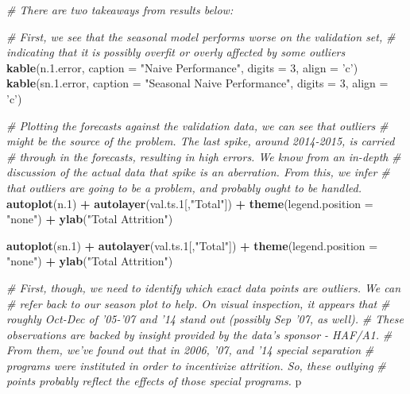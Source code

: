 \documentclass[12pt,letterpaper,toc=flat,oneside]{report}
\newenvironment{Shaded}{\begin{snugshade}}{\end{snugshade}}
\newcommand{\CommentTok}[1]{\textcolor[rgb]{0.56,0.35,0.01}{\textit{#1}}}
\newcommand{\DataTypeTok}[1]{\textcolor[rgb]{0.13,0.29,0.53}{#1}}
\newcommand{\DecValTok}[1]{\textcolor[rgb]{0.00,0.00,0.81}{#1}}
\newcommand{\FloatTok}[1]{\textcolor[rgb]{0.00,0.00,0.81}{#1}}
\newcommand{\KeywordTok}[1]{\textcolor[rgb]{0.13,0.29,0.53}{\textbf{#1}}}
\newcommand{\NormalTok}[1]{#1}
\newcommand{\OperatorTok}[1]{\textcolor[rgb]{0.81,0.36,0.00}{\textbf{#1}}}
\newcommand{\StringTok}[1]{\textcolor[rgb]{0.31,0.60,0.02}{#1}}
\theoremstyle{definition}
\theoremstyle{definition}
\theoremstyle{definition}
\theoremstyle{remark}
\begin{document}
\begin{Shaded}
\begin{Highlighting}[]
{{{{{{{{{{{{{{{{\CommentTok{# There are two takeaways from results below:}

\CommentTok{# First, we see that the seasonal model performs worse on the validation set, }
\CommentTok{# indicating that it is possibly overfit or overly affected by some outliers}
\KeywordTok{kable}\NormalTok{(n.}\FloatTok{1.}\NormalTok{error, }\DataTypeTok{caption =} \StringTok{"Naive Performance"}\NormalTok{, }\DataTypeTok{digits =} \DecValTok{3}\NormalTok{, }\DataTypeTok{align =} \StringTok{'c'}\NormalTok{)}
\KeywordTok{kable}\NormalTok{(sn.}\FloatTok{1.}\NormalTok{error, }\DataTypeTok{caption =} \StringTok{"Seasonal Naive Performance"}\NormalTok{, }\DataTypeTok{digits =} \DecValTok{3}\NormalTok{, }\DataTypeTok{align =} \StringTok{'c'}\NormalTok{)}


\CommentTok{# Plotting the forecasts against the validation data, we can see that outliers}
\CommentTok{# might be the source of the problem. The last spike, around 2014-2015, is carried}
\CommentTok{# through in the forecasts, resulting in high errors. We know from an in-depth }
\CommentTok{# discussion of the actual data that spike is an aberration. From this, we infer}
\CommentTok{# that outliers are going to be a problem, and probably ought to be handled.}
\KeywordTok{autoplot}\NormalTok{(n}\FloatTok{.1}\NormalTok{) }\OperatorTok{+}
\StringTok{  }\KeywordTok{autolayer}\NormalTok{(val.ts}\FloatTok{.1}\NormalTok{[,}\StringTok{"Total"}\NormalTok{]) }\OperatorTok{+}
\StringTok{  }\KeywordTok{theme}\NormalTok{(}\DataTypeTok{legend.position =} \StringTok{"none"}\NormalTok{) }\OperatorTok{+}
\StringTok{  }\KeywordTok{ylab}\NormalTok{(}\StringTok{"Total Attrition"}\NormalTok{)}

\KeywordTok{autoplot}\NormalTok{(sn}\FloatTok{.1}\NormalTok{) }\OperatorTok{+}
\StringTok{  }\KeywordTok{autolayer}\NormalTok{(val.ts}\FloatTok{.1}\NormalTok{[,}\StringTok{"Total"}\NormalTok{]) }\OperatorTok{+}
\StringTok{  }\KeywordTok{theme}\NormalTok{(}\DataTypeTok{legend.position =} \StringTok{"none"}\NormalTok{) }\OperatorTok{+}
\StringTok{  }\KeywordTok{ylab}\NormalTok{(}\StringTok{"Total Attrition"}\NormalTok{)}

\CommentTok{# First, though, we need to identify which exact data points are outliers. We can }
\CommentTok{# refer back to our season plot to help. On visual inspection, it appears that }
\CommentTok{# roughly Oct-Dec of '05-'07 and '14 stand out (possibly Sep '07, as well).}
\CommentTok{# These observations are backed by insight provided by the data's sponsor - HAF/A1.}
\CommentTok{# From them, we've found out that in 2006, '07, and '14 special separation}
\CommentTok{# programs were instituted in order to incentivize attrition. So, these outlying }
\CommentTok{# points probably reflect the effects of those special programs.}
\NormalTok{p}

}}}}}}}}}}}}}}}}
\end{Highlighting}
\end{Shaded}
\end{document}
